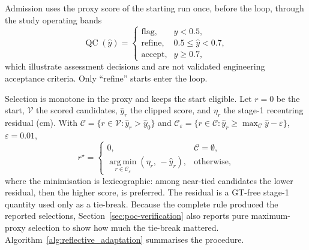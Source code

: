 \documentclass[a4paper,fleqn]{cas-dc}
\begin{document}
Admission uses the proxy score of the starting run once, before the loop, through the study operating bands
\begin{equation}
\operatorname{QC}(\hat y)=
\begin{cases}
\text{flag}, & \hat y<0.5,\\
\text{refine}, & 0.5\le\hat y<0.7,\\
\text{accept}, & \hat y\ge0.7,
\end{cases}
\label{eq:qc-bands}
\end{equation}
which illustrate assessment decisions and are not validated engineering acceptance criteria. Only ``refine'' starts enter the loop.

Selection is monotone in the proxy and keeps the start eligible. Let $r=0$ be the start, $\mathcal V$ the scored candidates, $\hat y_r$ the clipped score, and $\eta_r$ the stage-1 recentring residual (cm). With $\mathcal C=\{r\in\mathcal V:\hat y_r>\hat y_0\}$ and $\mathcal C_\varepsilon=\{r\in\mathcal C:\hat y_r\ge\max_{\mathcal C}\hat y-\varepsilon\}$, $\varepsilon=0.01$,
\begin{equation}
r^\star=
\begin{cases}
0, & \mathcal C=\emptyset,\\
\operatorname*{arg\,min}_{r\in\mathcal C_\varepsilon}(\eta_r,\,-\hat y_r), & \text{otherwise},
\end{cases}
\label{eq:refinement-selection}
\end{equation}
where the minimisation is lexicographic: among near-tied candidates the lower residual, then the higher score, is preferred. The residual is a GT-free stage-1 quantity used only as a tie-break. Because the complete rule produced the reported selections, Section~\ref{sec:poc-verification} also reports pure maximum-proxy selection to show how much the tie-break mattered. Algorithm~\ref{alg:reflective_adaptation} summarises the procedure.
\end{document}

